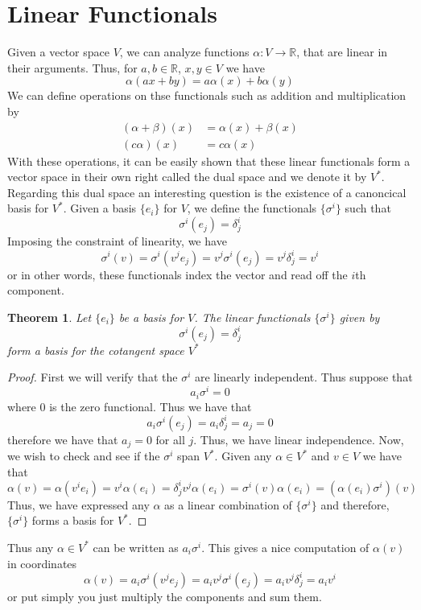 \documentclass[a4paper]{article}
\newtheorem*{thm}{Theorem}
\begin{document}
\section*{Linear Functionals}%
Given a vector space $V$, we can analyze functions $\alpha: V \rightarrow \mathds{R}$, that are linear in their arguments. Thus, for $a,b \in \mathds{R}$, $x,y \in V$ we have
\[
  \alpha(a x + b y) = a \alpha(x) + b \alpha(y)
\]
We can define operations on thse functionals such as addition and multiplication by
\[
  \begin{aligned}
    (\alpha + \beta)(x) &= \alpha(x) + \beta(x) \\
    (c\alpha)(x) &= c\alpha(x)
  \end{aligned}
\]
With these operations, it can be easily shown that these linear functionals form a vector space in their own right called the dual space and we denote it by $V^*$. Regarding this dual space an interesting question is the existence of a canoncical basis for $V^*$. Given a basis $\{e_i\}$ for $V$, we define the functionals $\{\sigma^i\}$ such that
\[
  \sigma^i(e_j) = \delta^i_j
\]
Imposing the constraint of linearity, we have
\[
  \sigma^i(v) = \sigma^i \left( v^je_j \right) = v^j\sigma^i(e_j) = v^j \delta_j^i = v^i
\]
or in other words, these functionals index the vector and read off the $i$th component. 

\begin{thm}
  Let $\{e_i\}$ be a basis for $V$. The linear functionals $\{\sigma^i\}$ given by 
  \[
    \sigma^i(e_j) = \delta^i_j
  \]
  form a basis for the cotangent space $V^*$
\end{thm}

\begin{proof}
  First we will verify that the $\sigma^i$ are linearly independent. Thus suppose that
  \[
    a_i \sigma^i = 0
  \]
  where $0$ is the zero functional. Thus we have that
  \[
    a_i \sigma^i(e_j) = a_i \delta^i_j = a_j = 0
  \]
  therefore we have that $a_j = 0$ for all $j$. Thus, we have linear independence. Now, we wish to check and see if the $\sigma^i$ span $V^*$. Given any $\alpha \in V^*$ and $v \in V$ we have that
  \[
    \alpha(v) =  \alpha(v^ie_i) = v^i\alpha(e_i) = \delta_j^iv^j \alpha(e_i) = \sigma^i(v) \alpha(e_i) = (\alpha(e_i)\sigma^i)(v)
  \]
  Thus, we have expressed any $\alpha$ as a linear combination of $\{\sigma^i\}$ and therefore, $\{\sigma^i\}$ forms a basis for $V^*$.
\end{proof}
Thus any $\alpha \in V^*$ can be written as $a_i \sigma^i$. This gives a nice computation of $\alpha(v)$ in coordinates
\[
  \alpha(v) = a_i\sigma^i(v^je_j) = a_iv^j \sigma^i(e_j) = a_iv^j \delta^i_j = a_iv^i
\]
or put simply you just multiply the components and sum them.
\end{document}
